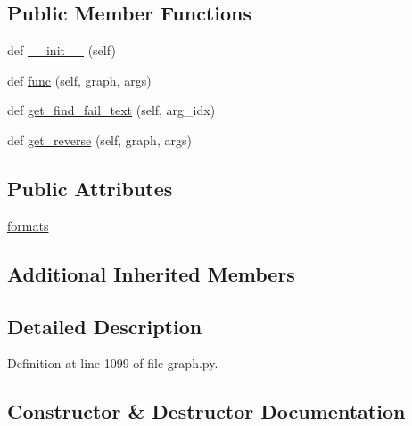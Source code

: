 \subsection*{Public Member Functions}
\begin{DoxyCompactItemize}
\item 
def \hyperlink{classlight__chats_1_1graph_1_1HugFunction_a81c1cd2d40ab9b90fe143276b63b0090}{\+\_\+\+\_\+init\+\_\+\+\_\+} (self)
\item 
def \hyperlink{classlight__chats_1_1graph_1_1HugFunction_a581fcc58cb0a76a19a02d8c87d911fb9}{func} (self, graph, args)
\item 
def \hyperlink{classlight__chats_1_1graph_1_1HugFunction_a3a8b8178a34dff402172109bcd9c9ebf}{get\+\_\+find\+\_\+fail\+\_\+text} (self, arg\+\_\+idx)
\item 
def \hyperlink{classlight__chats_1_1graph_1_1HugFunction_ae028317cf500a21a8787b73ca7964e48}{get\+\_\+reverse} (self, graph, args)
\end{DoxyCompactItemize}
\subsection*{Public Attributes}
\begin{DoxyCompactItemize}
\item 
\hyperlink{classlight__chats_1_1graph_1_1HugFunction_a9671b61b4a4c5e2d97093da92ec4a431}{formats}
\end{DoxyCompactItemize}
\subsection*{Additional Inherited Members}


\subsection{Detailed Description}
\begin{DoxyVerb}\end{DoxyVerb}
 

Definition at line 1099 of file graph.\+py.



\subsection{Constructor \& Destructor Documentation}
\mbox{\label{classlight__chats_1_1graph_1_1HugFunction_a81c1cd2d40ab9b90fe143276b63b0090}} 
